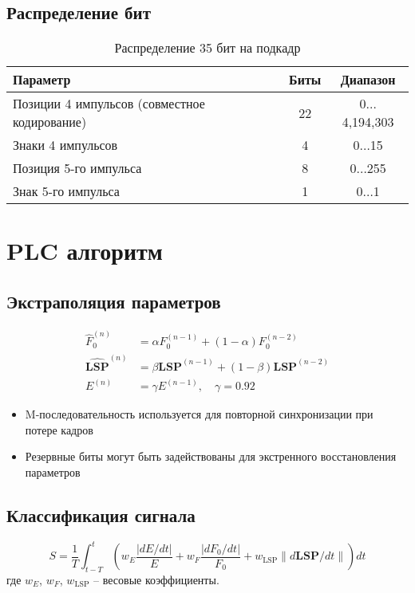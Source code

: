 \documentclass{report}
\begin{document}
	\subsection{Распределение бит}
	\begin{table}[H]
		\centering
		\caption{Распределение 35 бит на подкадр}
		\begin{tabular}{lcc}
			\toprule
			\textbf{Параметр} & \textbf{Биты} & \textbf{Диапазон} \\
			\midrule
			Позиции 4 импульсов (совместное кодирование) & 22 & 0$\ldots$4,194,303 \\
			Знаки 4 импульсов & 4 & 0$\ldots$15 \\
			Позиция 5-го импульса & 8 & 0$\ldots$255 \\
			Знак 5-го импульса & 1 & 0$\ldots$1 \\
			\bottomrule
		\end{tabular}
	\end{table}
	
	\section{PLC алгоритм}
	\subsection{Экстраполяция параметров}
	\begin{align}
		\hat{F}_0^{(n)} &= \alpha F_0^{(n-1)} + (1-\alpha) F_0^{(n-2)} \\
		\hat{\mathbf{LSP}}^{(n)} &= \beta \mathbf{LSP}^{(n-1)} + (1-\beta) \mathbf{LSP}^{(n-2)} \\
		E^{(n)} &= \gamma E^{(n-1)}, \quad \gamma = 0.92
	\end{align}
	
	\begin{itemize}
		\item M-последовательность используется для повторной синхронизации при потере кадров
		\item Резервные биты могут быть задействованы для экстренного восстановления параметров 
	\end{itemize}
	
	\subsection{Классификация сигнала}
	\begin{equation}
		S = \frac{1}{T} \int_{t-T}^{t} \left( w_E \frac{|dE/dt|}{E} + w_F \frac{|dF_0/dt|}{F_0} + w_{\text{LSP}} \|d\mathbf{LSP}/dt\| \right) dt
	\end{equation}
	где $w_E$, $w_F$, $w_{\text{LSP}}$ -- весовые коэффициенты.
	
\end{document}
